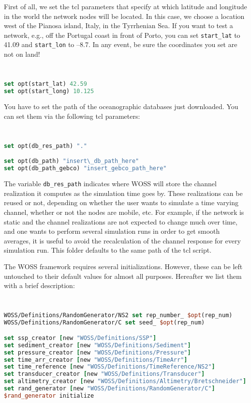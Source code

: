 \documentclass[11pt]{article}
\begin{document}
\clearpage

First of all, we set the tcl parameters that specify at which latitude and longitude in the world the network nodes will be located. In this case, we choose a location west of the Pianosa island, Italy, in the Tyrrhenian Sea. If you want to test a network, e.g.,  off the Portugal coast in front of Porto, you can set {\tt start\_lat} to 41.09 and {\tt start\_lon} to --8.7. In any event, be sure the coordinates you set are not on land!

{\scriptsize\tt
\label{latlon_set}
\begin{lstlisting}[language=tcl]
set opt(start_lat) 42.59 
set opt(start_long) 10.125
\end{lstlisting}
}

\vspace{\baselinestretch\baselineskip}

You have to set the path of the oceanographic databases just downloaded. You can set them via the following tcl parameters: 

{\scriptsize\tt
\begin{lstlisting}[language=tcl]
set opt(db_res_path) "."

set opt(db_path) "insert\_db_path_here"
set opt(db_path_gebco) "insert_gebco_path_here"
\end{lstlisting}
}


The variable {\tt db\_res\_path} indicates where WOSS will store the channel realization it computes as the simulation time goes by. These realizations can be reused or not, depending on whether the user wants to simulate a time varying channel, whether or not the nodes are mobile, etc. For example, if the network is static and the channel realizations are not expected to change much over time, and one wants to perform several simulation runs in order to get smooth averages, it is useful to avoid the recalculation of the channel response for every simulation run. This folder defaults to the same path of the tcl script.

\vspace{\baselinestretch\baselineskip}

The WOSS framework requires several initializations. However, these can be left untouched to their default values for almost all purposes. Hereafter we list them with a brief description:

{\scriptsize\tt
\begin{lstlisting}[language=tcl]
WOSS/Definitions/RandomGenerator/NS2 set rep_number_ $opt(rep_num)
WOSS/Definitions/RandomGenerator/C set seed_ $opt(rep_num)

set ssp_creator [new "WOSS/Definitions/SSP"]
set sediment_creator [new "WOSS/Definitions/Sediment"]
set pressure_creator [new "WOSS/Definitions/Pressure"]
set time_arr_creator [new "WOSS/Definitions/TimeArr"]
set time_reference [new "WOSS/Definitions/TimeReference/NS2"]
set transducer_creator [new "WOSS/Definitions/Transducer"]
set altimetry_creator [new "WOSS/Definitions/Altimetry/Bretschneider"]
set rand_generator [new "WOSS/Definitions/RandomGenerator/C"]
$rand_generator initialize
\end{lstlisting}
}
\end{document}
